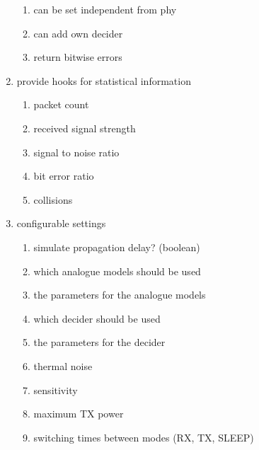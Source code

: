 \begin{enumerate}
\begin{enumerate}
			\item can be set independent from phy \label{deciderIndependent}
			\item can add own decider \label{deciderExtensible}
			\item return bitwise errors \label{deciderBitwise}
			\end{enumerate}
 \item provide hooks for statistical information
	\begin{enumerate}
	\item packet count \label{statPackets}
	\item received signal strength \label{statRSS}
	\item signal to noise ratio \label{statSNR}
	\item bit error ratio \label{statBER}
	\item collisions \label{statColls}
	\end{enumerate}
 \item configurable settings
	\begin{enumerate}
	\item simulate propagation delay? (boolean) \label{confDelay}
	\item which analogue models should be used \label{confAnalogue}
	\item the parameters for the analogue models \label{confAnalogueParam}
	\item which decider should be used \label{confDecider}
	\item the parameters for the decider \label{confDeciderParam}
	\item thermal noise \label{confNoise}
	\item sensitivity \label{confSens}
	\item maximum TX power \label{confMaxTXPower}
	\item switching times between modes (RX, TX, SLEEP) \label{confSwitchingTimes}
	\end{enumerate}
\end{enumerate}


